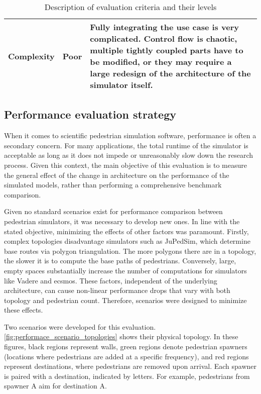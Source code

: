 \documentclass[twoside, 11pt]{article}
\begin{document}
\begin{center}
\begin{table}[h!]
\begin{tabularx}{\textwidth}{ | p{2.9cm} | l | X | }
      \\ 
      \hline
      Complexity & Poor & 
      Fully integrating the use case is very complicated. Control flow is chaotic, multiple tightly coupled parts have to be modified, or they may require a large redesign of the architecture of the simulator itself.
      \\ 
      \hline
    \end{tabularx}
    \caption{Description of evaluation criteria and their levels}
    \label{table:qualitative-evaluation-criteria}
  \end{table}
\end{center}

\subsection{Performance evaluation strategy} \label{sec:performace-evaluation}

When it comes to scientific pedestrian simulation software, performance is often a secondary concern. For many applications, the total runtime of the simulator is acceptable as long as it does not impede or unreasonably slow down the research process. Given this context, the main objective of this evaluation is to measure the general effect of the change in architecture on the performance of the simulated models, rather than performing a comprehensive benchmark comparison.

Given no standard scenarios exist for performance comparison between pedestrian simulators, it was necessary to develop new ones. In line with the stated objective, minimizing the effects of other factors was paramount. Firstly, complex topologies disadvantage simulators such as JuPedSim, which determine base routes via polygon triangulation. The more polygons there are in a topology, the slower it is to compute the base paths of pedestrians. Conversely, large, empty spaces substantially increase the number of computations for simulators like Vadere and \gls{ecsmos}. These factors, independent of the underlying architecture, can cause non-linear performance drops that vary with both topology and pedestrian count. Therefore, scenarios were designed to minimize these effects.

Two scenarios were developed for this evaluation. \autoref{fig:performace_scenario_topologies} shows their physical topology. In these figures, black regions represent walls, green regions denote pedestrian spawners (locations where pedestrians are added at a specific frequency), and red regions represent destinations, where pedestrians are removed upon arrival. Each spawner is paired with a destination, indicated by letters. For example, pedestrians from spawner A aim for destination A.
\end{document}

